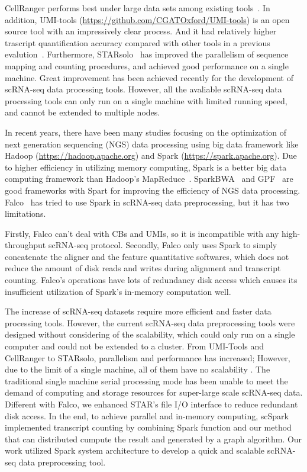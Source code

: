 \documentclass[conference]{IEEEtran}
\begin{document}
CellRanger performs best under large data sets among existing tools~\cite{Gao2020Comparison}.
In addition, UMI-tools (\url{https://github.com/CGATOxford/UMI-tools}) is an open source tool with an impressively clear process. And it had relatively higher trascript quantification accuracy compared with other tools in a previous evalution~\cite{Gao2020Comparison}. 
Furthermore, STARsolo~\cite{Blibaum2019STARsolo} has improved the parallelism of sequence mapping and counting procedures, and achieved good performance on a single machine.
Great improvement has been achieved recently for the development of scRNA-seq data processing tools. However, all the avaliable scRNA-seq data processing tools can only run on a single machine with limited running speed, and cannot be extended to multiple nodes.

In recent years, there have been many studies focusing on the optimization of next generation sequencing (NGS) data processing using big data framework like Hadoop (\url{https://hadoop.apache.org}) and Spark (\url{https://spark.apache.org}). 
Due to higher efficiency in utilizing memory computing, Spark is a better big data computing framework than Hadoop's MapReduce~\cite{Dean2008MapReduce, Zaharia2012Resilient}. 
SparkBWA~\cite{Abun2016SparkBWA} and GPF~\cite{Li2018Highperformance} are good frameworks with Spart for improving the efficiency of NGS data processing. 
Falco~\cite{Yang2017Falco} has tried to use Spark in scRNA-seq data preprocessing, but it has two limitations. 

Firstly, Falco can't deal with CBs and UMIs, so it is incompatible with any high-throughput scRNA-seq protocol.
Secondly, Falco only uses Spark to simply concatenate the aligner and the feature quantitative softwares, which does not reduce the amount of disk reads and writes during alignment and transcript counting.
Falco’s operations have lots of redundancy disk access which causes its insufficient utilization of Spark’s in-memory computation well. 

The increase of scRNA-seq datasets require more efficient and faster data processing tools.
However, the current scRNA-seq data preprocessing tools were designed without considering of the scalability, which could only run on a single computer and could not be extended to a cluster. From UMI-Tools and CellRanger to STARsolo, parallelism and performance has increased; However, due to the limit of a single machine, all of them have no scalability . 
The traditional single machine serial processing mode has been unable to meet the demand of computing and storage resources for super-large scale scRNA-seq data.
Different with Falco, we enhanced STAR's file I/O interface to reduce redundant disk access.
In the end, to achieve parallel and in-memory computing, scSpark implemented transcript counting by combining Spark function and our method that can distributed cumpute the result and generated by a graph algorithm.
Our work utilized Spark system architecture to develop a quick and scalable scRNA-seq data preprocessing tool. 
\end{document}
